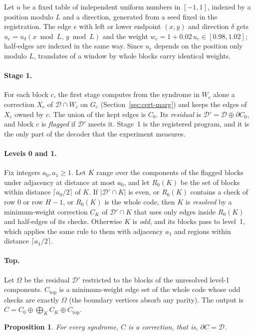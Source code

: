 \documentclass[11pt]{amsart}
\newtheorem{proposition}[theorem]{Proposition}
\theoremstyle{definition}
\theoremstyle{remark}
\numberwithin{equation}{section}
\newcommand{\cD}{\mathcal{D}}
\begin{document}
Let $u$ be a fixed table of independent uniform numbers in $[-1,1]$, indexed by a position modulo $L$ and a direction, generated from a seed fixed in the registration. The edge $e$ with left or lower endpoint $(x,y)$ and direction $\delta$ gets $u_e=u_\delta(x\bmod L,\,y\bmod L)$ and the weight $w_e=1+0.02\,u_e\in[0.98,1.02]$; half-edges are indexed in the same way. Since $u_e$ depends on the position only modulo $L$, translates of a window by whole blocks carry identical weights.

\paragraph{Stage 1.} For each block $c$, the first stage computes from the syndrome in $W_c$ alone a correction $X_c$ of $\cD\cap W_c$ on $G_c$ (Section~\ref{sec:cert-marg}) and keeps the edges of $X_c$ owned by $c$. The union of the kept edges is $C_0$. Its \emph{residual} is $\cD'=\cD\oplus\partial C_0$, and block $c$ is \emph{flagged} if $\cD'$ meets it. Stage~1 is the registered program, and it is the only part of the decoder that the experiment measures.

\paragraph{Levels 0 and 1.} Fix integers $a_0,a_1\ge1$. Let $K$ range over the components of the flagged blocks under adjacency at distance at most $a_0$, and let $R_0(K)$ be the set of blocks within distance $\lceil a_0/2\rceil$ of $K$. If $|\cD'\cap K|$ is even, or $R_0(K)$ contains a check of row $0$ or row $H-1$, or $R_0(K)$ is the whole code, then $K$ is \emph{resolved} by a minimum-weight correction $C_K$ of $\cD'\cap K$ that uses only edges inside $R_0(K)$ and half-edges of its checks. Otherwise $K$ is \emph{odd}, and its blocks pass to level~1, which applies the same rule to them with adjacency $a_1$ and regions within distance $\lceil a_1/2\rceil$.

\paragraph{Top.} Let $\Omega$ be the residual $\cD'$ restricted to the blocks of the unresolved level-1 components. $C_{\mathrm{top}}$ is a minimum-weight edge set of the whole code whose odd checks are exactly $\Omega$ (the boundary vertices absorb any parity). The output is $C=C_0\oplus\bigoplus_KC_K\oplus C_{\mathrm{top}}$.

\begin{proposition}\label{prop:cert-valid}
For every syndrome, $C$ is a correction, that is, $\partial C=\cD$.
\end{proposition}
\end{document}
